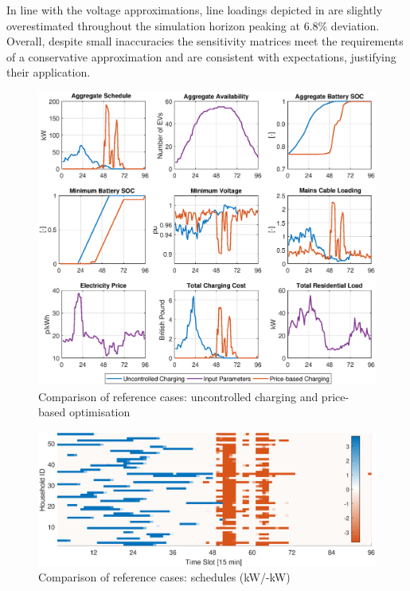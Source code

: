 In line with the voltage approximations, line loadings depicted in  are slightly overestimated throughout the simulation horizon peaking at 6.8\% deviation. Overall, despite small inaccuracies the sensitivity matrices meet the requirements of a conservative approximation and are consistent with expectations, justifying their application. 

\begin{figure}[]
	\includegraphics[width=\textwidth,trim={1.5cm 0cm 2cm 0.2cm},clip]{figures/reference/dumb_ex.eps}
	\caption{Comparison of reference cases: uncontrolled charging and price-based optimisation}
	\label{fig:dumbprice}
\end{figure}

\begin{figure}[]
	\includegraphics[width=\textwidth,trim={1.5cm 0cm 2cm 0.2cm},clip]{figures/reference/ref_scheds.eps}
	\caption{Comparison of reference cases: schedules (kW/-kW)}
	\label{fig:ref_scheds}
\end{figure}

